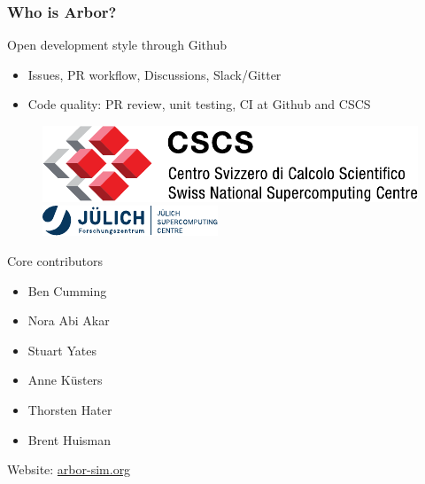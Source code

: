 \documentclass[t]{beamer}
\begin{document}
\begin{frame}
    \frametitle{Who is Arbor?}

    Open development style through Github
    \begin{itemize}
        \item Issues, PR workflow, Discussions, Slack/Gitter
        \item Code quality: PR review, unit testing, CI at Github and CSCS
    \end{itemize}

    \begin{figure}
        \begin{center}
            \includegraphics[width=\linewidth]{cscs_logo.pdf}
        \end{center}
        \vspace{0.1\baselineskip}
        \begin{center}
            \includegraphics[width=\linewidth]{Logo_FZJ_JSC.pdf}
        \end{center}
    \end{figure}

    Core contributors
    \begin{itemize}
        \item Ben Cumming
        \item Nora Abi Akar
        \item Stuart Yates
        \item Anne Küsters
        \item Thorsten Hater
        \item Brent Huisman
    \end{itemize}

    Website: \url{arbor-sim.org}

\end{frame}
\end{document}
